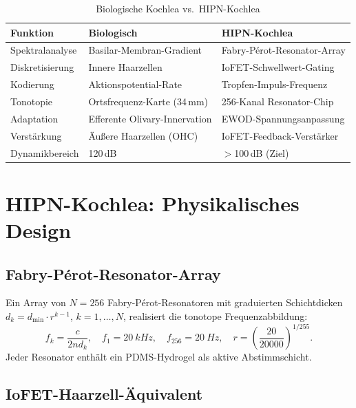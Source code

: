 ﻿\documentclass[a4paper,12pt]{scrreprt}
\theoremstyle{definition}
\begin{document}
\begin{table}[H]
\caption{Biologische Kochlea vs.\ HIPN-Kochlea}
\label{tab:nf6_vergleich}
\begin{tabular}{lll}
\toprule
\textbf{Funktion} & \textbf{Biologisch} & \textbf{HIPN-Kochlea} \\
\midrule
Spektralanalyse    & Basilar-Membran-Gradient      & Fabry-Pérot-Resonator-Array \\
Diskretisierung    & Innere Haarzellen             & IoFET-Schwellwert-Gating \\
Kodierung          & Aktionspotential-Rate         & Tropfen-Impuls-Frequenz \\
Tonotopie          & Ortsfrequenz-Karte (34\,mm)   & 256-Kanal Resonator-Chip \\
Adaptation         & Efferente Olivary-Innervation & EWOD-Spannungsanpassung \\
Verstärkung        & Äußere Haarzellen (OHC)       & IoFET-Feedback-Verstärker \\
Dynamikbereich     & 120\,dB                       & $>$100\,dB (Ziel) \\
\bottomrule
\end{tabular}
\end{table}

\section{HIPN-Kochlea: Physikalisches Design}

\subsection{Fabry-Pérot-Resonator-Array}

Ein Array von $N=256$ Fabry-Pérot-Resonatoren mit graduierten
Schichtdicken $d_k = d_{\min} \cdot r^{k-1}$, $k=1,\ldots,N$,
realisiert die tonotope Frequenzabbildung:
\[
  f_k = \frac{c}{2 n d_k}, \quad f_1 = \SI{20}{kHz},
  \quad f_{256} = \SI{20}{Hz}, \quad r = \left(\frac{20}{20000}\right)^{1/255}.
\]
Jeder Resonator enthält ein PDMS-Hydrogel als aktive Abstimmschicht.

\subsection{IoFET-Haarzell-Äquivalent}
\end{document}
